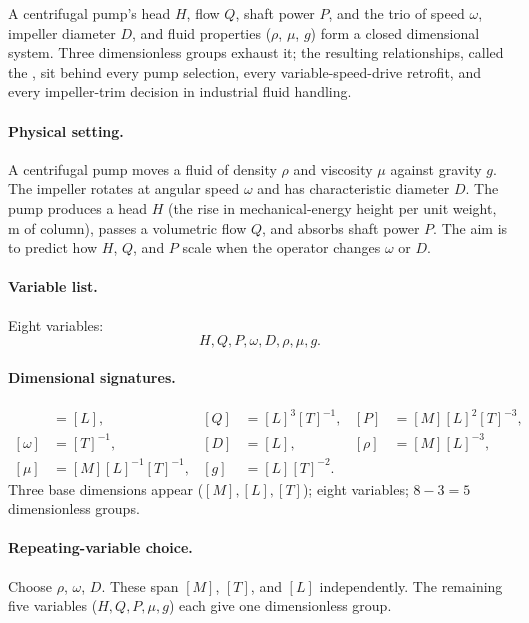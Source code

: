 A centrifugal pump's head $H$, flow $Q$, shaft power $P$, and the
trio of speed $\omega$, impeller diameter $D$, and fluid properties
($\rho$, $\mu$, $g$) form a closed dimensional system. Three
dimensionless groups exhaust it; the resulting relationships, called
the , sit behind every pump selection,
every variable-speed-drive retrofit, and every impeller-trim decision
in industrial fluid handling.

\paragraph{Physical setting.} A centrifugal pump moves a fluid of
density $\rho$ and viscosity $\mu$ against gravity $g$. The impeller
rotates at angular speed $\omega$ and has characteristic diameter
$D$. The pump produces a head $H$ (the rise in mechanical-energy
height per unit weight, $\si{\meter}$ of column), passes a volumetric
flow $Q$, and absorbs shaft power $P$. The aim is to predict how
$H$, $Q$, and $P$ scale when the operator changes $\omega$ or $D$.

\paragraph{Variable list.} Eight variables:
\[
H, Q, P, \omega, D, \rho, \mu, g.
\]

\paragraph{Dimensional signatures.}
\begin{align*}
[H] &= [L], & [Q] &= [L]^{3}[T]^{-1}, & [P] &= [M][L]^{2}[T]^{-3}, \\
[\omega] &= [T]^{-1}, & [D] &= [L], & [\rho] &= [M][L]^{-3}, \\
[\mu] &= [M][L]^{-1}[T]^{-1}, & [g] &= [L][T]^{-2}.
\end{align*}
Three base dimensions appear ($[M], [L], [T]$); eight variables;
$8 - 3 = 5$ dimensionless groups.

\paragraph{Repeating-variable choice.} Choose $\rho$, $\omega$, $D$.
These span $[M]$, $[T]$, and $[L]$ independently. The remaining five
variables ($H, Q, P, \mu, g$) each give one dimensionless group.

